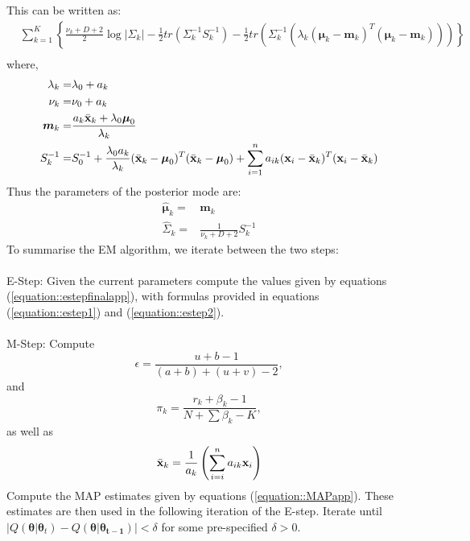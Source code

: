 \documentclass[12pt,english]{article}
\begin{document}
This can be written as:
\begin{equation}\label{equation::MobjFinal}
\begin{split}
&\sum_{k=1}^{K} \left\{\frac{\nu_k + D + 2}{2} \log|\Sigma_k|  - \frac{1}{2} tr \left(\Sigma_{k}^{-1} S_k^{-1}\right)-\frac{1}{2} tr \left( \Sigma_{k}^{-1}\left(\lambda_k(\boldsymbol{\mu}_k - \boldsymbol{m}_k)^T(\boldsymbol{\mu}_k - \boldsymbol{m}_k)\right)\right)\right\} \\
\end{split}
\end{equation}
where,
\begin{equation}\label{equation::Posterior}
\begin{split}
\lambda_k = &\lambda_0 + a_k \\
\nu_k = & \nu_0 + a_k \\
\boldsymbol{m}_k = & \frac{a_k\bar{{\bf x}}_k + \lambda_0\boldsymbol{\mu}_0}{\lambda_k}\\
S_k^{-1}  = & S_0^{-1} + \frac{\lambda_0 a_k}{\lambda_k}(\bar{{\bf x}}_k - \boldsymbol{\mu}_0)^{T} (\bar{{\bf x}}_k - \boldsymbol{\mu}_0) + \sum_{i=1}^{n} a_{ik}({\bf x}_i -\bar{{\bf x}}_k)^{T}({\bf x}_i -\bar{{\bf x}}_k)
\end{split}
\end{equation}
Thus the parameters of the posterior mode are:
\begin{equation}\label{equation::MAPapp}
\begin{split}
\boldsymbol{\hat{\mu}}_k = &\boldsymbol{m}_k \\
\hat{\Sigma}_k = & \frac{1}{\nu_k + D + 2}S_k^{-1}
\end{split}
\end{equation}
To summarise the EM algorithm, we iterate between the two steps:
\\
\\
E-Step: Given the current parameters compute the values given by equations (\ref{equation::estepfinalapp}), with formulas provided in equations (\ref{equation::estep1}) and (\ref{equation::estep2}).
\\
\\
M-Step:
Compute
\[\epsilon = \frac{ u + b - 1}{(a+b) + (u+v) - 2},\]
and
\[\pi_k = \frac{r_k + \beta_k - 1}{N + \sum \beta_k - K},\]
as well as
\[\bar{{\bf x}}_k = \frac{1}{a_k}\left(\sum_{i=i}^{n}a_{ik}{\bf x}_i\right)\]
Compute the MAP estimates given by equations (\ref{equation::MAPapp}). These estimates are then used in the following iteration of the E-step. Iterate until $\lvert Q(\boldsymbol{\theta}|\boldsymbol{\theta}_{t}) - Q(\boldsymbol{\theta}|\boldsymbol{\theta_{t-1}})\rvert < \delta$ for some pre-specified $\delta >0$.
\end{document}

